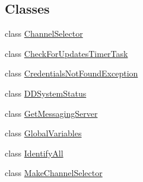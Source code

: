 \subsection*{Classes}
\begin{DoxyCompactItemize}
\item 
class \hyperlink{classgov_1_1fnal_1_1ppd_1_1dd_1_1ChannelSelector}{Channel\-Selector}
\item 
class \hyperlink{classgov_1_1fnal_1_1ppd_1_1dd_1_1CheckForUpdatesTimerTask}{Check\-For\-Updates\-Timer\-Task}
\item 
class \hyperlink{classgov_1_1fnal_1_1ppd_1_1dd_1_1CredentialsNotFoundException}{Credentials\-Not\-Found\-Exception}
\item 
class \hyperlink{classgov_1_1fnal_1_1ppd_1_1dd_1_1DDSystemStatus}{D\-D\-System\-Status}
\item 
class \hyperlink{classgov_1_1fnal_1_1ppd_1_1dd_1_1GetMessagingServer}{Get\-Messaging\-Server}
\item 
class \hyperlink{classgov_1_1fnal_1_1ppd_1_1dd_1_1GlobalVariables}{Global\-Variables}
\item 
class \hyperlink{classgov_1_1fnal_1_1ppd_1_1dd_1_1IdentifyAll}{Identify\-All}
\item 
class \hyperlink{classgov_1_1fnal_1_1ppd_1_1dd_1_1MakeChannelSelector}{Make\-Channel\-Selector}
\end{DoxyCompactItemize}
